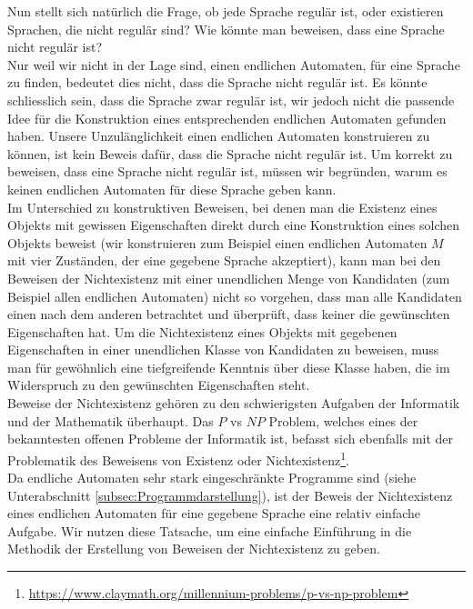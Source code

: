 \noindent
Nun stellt sich natürlich die Frage, ob jede Sprache regulär ist, oder existieren Sprachen, die nicht regulär sind? Wie könnte man beweisen, dass eine Sprache nicht regulär ist?\\
Nur weil wir nicht in der Lage sind, einen endlichen Automaten, für eine Sprache zu finden, bedeutet dies nicht, dass die Sprache nicht regulär ist. Es könnte schliesslich sein, dass die Sprache zwar regulär ist, wir jedoch nicht die passende Idee für die Konstruktion eines entsprechenden endlichen Automaten gefunden haben. Unsere Unzulänglichkeit einen endlichen Automaten konstruieren zu können, ist kein Beweis dafür, dass die Sprache nicht regulär ist. Um korrekt zu beweisen, dass eine Sprache nicht regulär ist, müssen wir begründen, warum es keinen endlichen Automaten für diese Sprache geben kann.\\

\noindent
Im Unterschied zu konstruktiven Beweisen, bei denen man die Existenz
eines Objekts mit gewissen Eigenschaften direkt durch eine Konstruktion eines solchen
Objekts beweist (wir konstruieren zum Beispiel einen endlichen Automaten $M$ mit vier Zuständen, der
eine gegebene Sprache akzeptiert), kann man bei den Beweisen der Nichtexistenz mit
einer unendlichen Menge von Kandidaten (zum Beispiel allen endlichen Automaten)
nicht so vorgehen, dass man alle Kandidaten einen nach dem anderen betrachtet und
überprüft, dass keiner die gewünschten Eigenschaften hat. Um die Nichtexistenz eines
Objekts mit gegebenen Eigenschaften in einer unendlichen Klasse von Kandidaten zu
beweisen, muss man für gewöhnlich eine tiefgreifende Kenntnis über diese Klasse haben,
die im Widerspruch zu den gewünschten Eigenschaften steht.\\

\noindent
Beweise der Nichtexistenz gehören zu den schwierigsten Aufgaben der Informatik und der Mathematik überhaupt. Das $P$ vs $NP$ Problem, welches eines der bekanntesten offenen Probleme der Informatik ist, befasst sich ebenfalls mit der Problematik des Beweisens von Existenz oder Nichtexistenz\footnote{\url{https://www.claymath.org/millennium-problems/p-vs-np-problem}}.\\
Da endliche Automaten sehr stark eingeschränkte Programme sind (siehe Unterabschnitt \cref{subsec:Programmdarstellung}), ist der Beweis der Nichtexistenz eines endlichen Automaten für eine gegebene Sprache eine relativ einfache Aufgabe. Wir nutzen diese Tatsache, um eine einfache
Einführung in die Methodik der Erstellung von Beweisen der Nichtexistenz zu geben.\\
\clearpage

